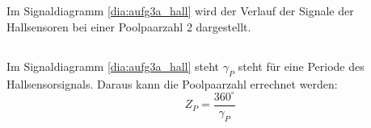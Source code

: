 \chapter{}\label{ex:aufg3}
%
\section{}\label{sec:aufg3a}
Im Signaldiagramm \ref{dia:aufg3a_hall} wird der Verlauf der Signale der Hallsensoren bei einer Poolpaarzahl 2 dargestellt. 


%
\section{}\label{sec:aufg3b}
Im Signaldiagramm \ref{dia:aufg3a_hall} steht $\gamma_P$ steht f\"ur eine Periode des Hallsensorsignals.
Daraus kann die Poolpaarzahl errechnet werden:
\begin{equation}
Z_P = \frac{360^\circ}{\gamma_P}
\label{for:poolpaarZahl}
\end{equation}
%